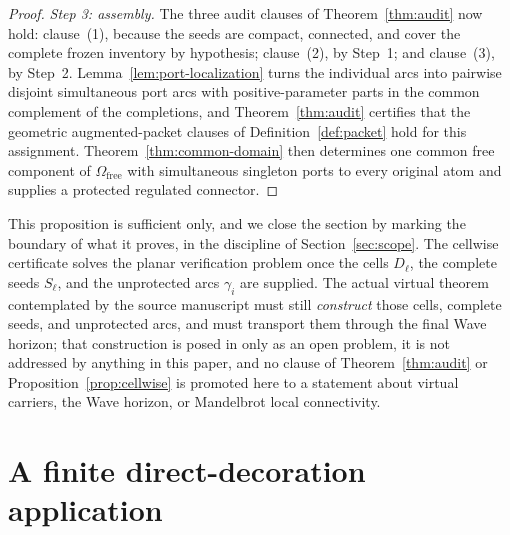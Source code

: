 \documentclass[11pt,reqno]{amsart}
\theoremstyle{definition}
\theoremstyle{remark}
\newcommand{\Omfree}{\Omega_{\mathrm{free}}}
\begin{document}
\begin{proof}
\emph{Step 3: assembly.}
The three audit clauses of Theorem~\ref{thm:audit} now hold: clause~(1), because the
seeds are compact, connected, and cover the complete frozen inventory by hypothesis;
clause~(2), by Step~1; and clause~(3), by Step~2. Lemma~\ref{lem:port-localization}
turns the individual arcs into pairwise disjoint simultaneous port arcs with
positive-parameter parts in the common complement of the completions, and
Theorem~\ref{thm:audit} certifies that the geometric augmented-packet clauses of
Definition~\ref{def:packet} hold for this assignment. Theorem~\ref{thm:common-domain}
then determines one common free component of $\Omfree$ with simultaneous singleton
ports to every original atom and supplies a protected regulated connector.
\end{proof}

This proposition is sufficient only, and we close the section by marking the
boundary of what it proves, in the discipline of Section~\ref{sec:scope}. The
cellwise certificate solves the planar verification problem once the cells
$D_\ell$, the complete seeds $S_\ell$, and the unprotected arcs $\gamma_i$ are
supplied. The actual virtual theorem contemplated by the source manuscript must
still \emph{construct} those cells, complete seeds, and unprotected arcs, and must
transport them through the final Wave horizon; that construction is posed in
\cite{MWman} only as an open problem, it is not addressed by anything in this paper,
and no clause of Theorem~\ref{thm:audit} or Proposition~\ref{prop:cellwise} is
promoted here to a statement about virtual carriers, the Wave horizon, or Mandelbrot
local connectivity.


\section{A finite direct-decoration application}\label{sec:decoration}
\end{document}

